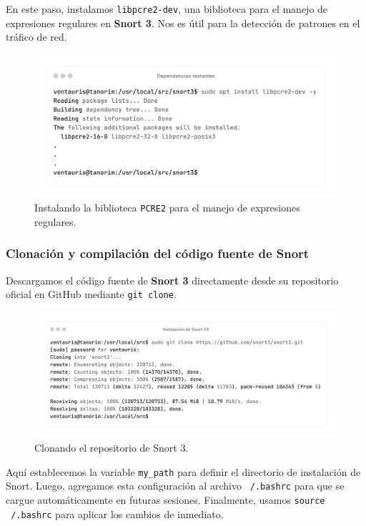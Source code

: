 \documentclass[11pt,a4paper,twoside]{report}
\begin{document}
En este paso, instalamos \texttt{libpcre2-dev}, una biblioteca para el manejo de expresiones regulares en \textbf{Snort 3}. Nos es útil para la detección de patrones en el tráfico de red.

\begin{figure}[H]
	\centering
	\includegraphics[scale=0.12]{instalacion_snort/20-20.png}
	\caption{Instalando la biblioteca \texttt{PCRE2} para el manejo de expresiones regulares.}
\end{figure}

\newpage

\subsubsection*{Clonación y compilación del código fuente de Snort}

Descargamos el código fuente de \textbf{Snort 3} directamente desde su repositorio oficial en GitHub mediante \texttt{git clone}.

\begin{figure}[H]
	\centering
	\includegraphics[scale=0.12]{instalacion_snort/17-17.png}
	\caption{Clonando el repositorio de Snort 3.}
\end{figure}

Aquí establecemos la variable \texttt{my\_path} para definir el directorio de instalación de Snort. Luego, agregamos esta configuración al archivo \texttt{~/.bashrc} para que se cargue automáticamente en futuras sesiones. Finalmente, usamos \texttt{source ~/.bashrc} para aplicar los cambios de inmediato.
\end{document}
